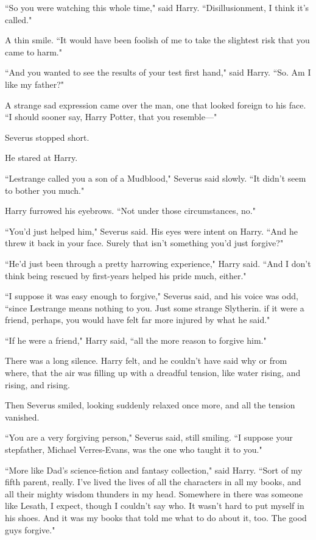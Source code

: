 ``So you were watching this whole time," said Harry. ``Disillusionment, I think it's called."

A thin smile. ``It would have been foolish of me to take the slightest risk that you came to harm."

``And you wanted to see the results of your test first hand," said Harry. ``So. Am I like my father?"

A strange sad expression came over the man, one that looked foreign to his face. ``I should sooner say, Harry Potter, that you resemble---"

Severus stopped short.

He stared at Harry.

``Lestrange called you a son of a Mudblood," Severus said slowly. ``It didn't seem to bother you much."

Harry furrowed his eyebrows. ``Not under those circumstances, no."

``You'd just helped him," Severus said. His eyes were intent on Harry. ``And he threw it back in your face. Surely that isn't something you'd just forgive?"

``He'd just been through a pretty harrowing experience," Harry said. ``And I don't think being rescued by first-years helped his pride much, either."

``I suppose it was easy enough to forgive," Severus said, and his voice was odd, ``since Lestrange means nothing to you. Just some strange Slytherin. if it were a friend, perhaps, you would have felt far more injured by what he said."

``If he were a friend," Harry said, ``all the more reason to forgive him."

There was a long silence. Harry felt, and he couldn't have said why or from where, that the air was filling up with a dreadful tension, like water rising, and rising, and rising.

Then Severus smiled, looking suddenly relaxed once more, and all the tension vanished.

``You are a very forgiving person," Severus said, still smiling. ``I suppose your stepfather, Michael Verres-Evans, was the one who taught it to you."

``More like Dad's science-fiction and fantasy collection," said Harry. ``Sort of my fifth parent, really. I've lived the lives of all the characters in all my books, and all their mighty wisdom thunders in my head. Somewhere in there was someone like Lesath, I expect, though I couldn't say who. It wasn't hard to put myself in his shoes. And it was my books that told me what to do about it, too. The good guys forgive."

